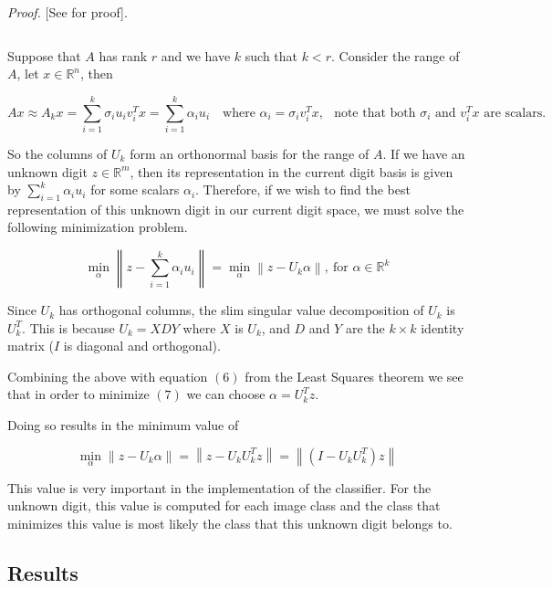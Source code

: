 \documentclass[a4paper]{article}
\newcommand{\vecnorm}[1]{\left\lVert#1\right\rVert}
\begin{document}
\textit{Proof.} [See \cite{elden} for proof].


$$
$$

Suppose that $A$ has rank $r$ and we have $k$ such that $k<r$.  Consider the range of $A$, let $x\in \mathbb{R}^n$, then


$$
Ax \approx A_k x = \sum_{i=1}^k \sigma_i u_i v_i^T x = \sum_{i=1}^k \alpha_i u_i
\quad
\text{where $\alpha_i=\sigma_iv_i^Tx$, $\:$ note that both $\sigma_i$ and $v_i^Tx$ are scalars.}
$$

So the columns of $U_k$ form an orthonormal basis for the range of $A$.  If we have an unknown digit $z\in \mathbb{R}^{m}$, then its representation in the current digit basis is given by $\sum_{i=1}^k\alpha_iu_i$ for some scalars $\alpha_i$.  Therefore, if we wish to find the best representation of this unknown digit in our current digit space, we must solve the  following minimization problem.

\begin{equation}
\min_{\alpha} \vecnorm{z-\sum_{i=1}^k\alpha_iu_i}
= \min_{\alpha} \vecnorm{z-U_k\alpha}
,\:
\text{for $\alpha \in \mathbb{R}^{k}$}
\end{equation}

Since $U_k$ has orthogonal columns, the slim singular value decomposition of $U_k$ is $U_k^T$.  This is because $U_k = XDY$ where $X$ is $U_k$, and $D$ and $Y$ are the $k\times k$ identity matrix ($I$ is diagonal and orthogonal).

Combining the above with equation $(6)$ from the Least Squares theorem we see that in order to minimize $(7)$ we can choose $\alpha = U_k^Tz$.

Doing so results in the minimum value of

\begin{equation}
\min_{\alpha} \vecnorm{z-U_k\alpha} = \vecnorm{z-U_kU_k^Tz} = \vecnorm{(I-U_kU_k^T)z}
\end{equation}

This value is very important in the implementation of the classifier.  For the unknown digit, this value is computed for each image class and the class that minimizes this value is most likely the class that this unknown digit belongs to.


\subsection{Results}
\end{document}
